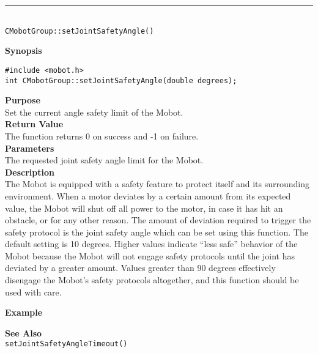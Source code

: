 \noindent
\vspace{5pt}
\rule{4.5in}{0.015in}\\
\noindent
{\LARGE \texttt{CMobotGroup::setJointSafetyAngle()}}\\
{}

\noindent
{\bf Synopsis}
\vspace{-8pt}
\begin{verbatim}
#include <mobot.h>
int CMobotGroup::setJointSafetyAngle(double degrees);
\end{verbatim}

\noindent
{\bf Purpose}\\
Set the current angle safety limit of the Mobot.\\

\noindent
{\bf Return Value}\\
The function returns 0 on success and -1 on failure.\\

\noindent
{\bf Parameters}\\
The requested joint safety angle limit for the Mobot.\\

\noindent
{\bf Description}\\
The Mobot is equipped with a safety feature to protect itself and its surrounding
environment. When a motor deviates by a certain amount from its expected value, 
the Mobot will shut off all power to the motor, in case it has hit an obstacle,
or for any other reason. The amount of deviation required to trigger the safety
protocol is the joint safety angle which can be set using this function.
The default setting is 10 degrees. Higher values indicate ``less safe'' behavior
of the Mobot because the Mobot will not engage safety protocols until the joint has
deviated by a greater amount. Values greater than 90 degrees effectively disengage
the Mobot's safety protocols altogether, and this function should be used with care.

\noindent
{\bf Example}\\
\noindent

\noindent
{\bf See Also}\\
\texttt{setJointSafetyAngleTimeout()}\\


